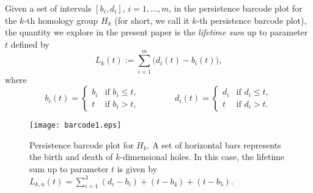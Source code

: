 \documentclass[11pt]{amsart}
\numberwithin{equation}{section}
\theoremstyle{plain}
\theoremstyle{definition}
\begin{document}
Given a set of intervals $[b_i, d_i]$, $i=1,\dots,m$, in the persistence barcode plot for the $k$-th homology group $H_k$ (for short, we call it $k$-th persistence barcode plot), the quantity we explore in the present paper is the \textit{lifetime sum} up to parameter $t$ defined by
\begin{equation}  \label{e:def.lifetime.sum}
L_k(t) := \sum_{i=1}^m \bigl( d_i(t) - b_i(t) \bigr),
\end{equation}
where
$$
b_i(t) = \begin{cases}  b_i & \text{if }  b_i \leq t,  \\
t & \text{if } b_i > t,
\end{cases}
\qquad \qquad
d_i(t) = \begin{cases}  d_i & \text{if }  d_i \leq t,  \\
t & \text{if } d_i > t.
\end{cases}
$$
\begin{figure}[!t]
\begin{center}
\texttt{[image: barcode1.eps]}
\caption{{\footnotesize Persistence barcode plot for $H_k$. A set of horizontal bars represents the birth and death of $k$-dimensional holes. In this case, the lifetime sum up to parameter $t$ is given by $L_{k,n}(t) = \sum_{i=1}^3 (d_i - b_i) + (t-b_4) + (t - b_5)$. }}
\label{f:barcode1}
\end{center}
\end{figure}
\end{document}

